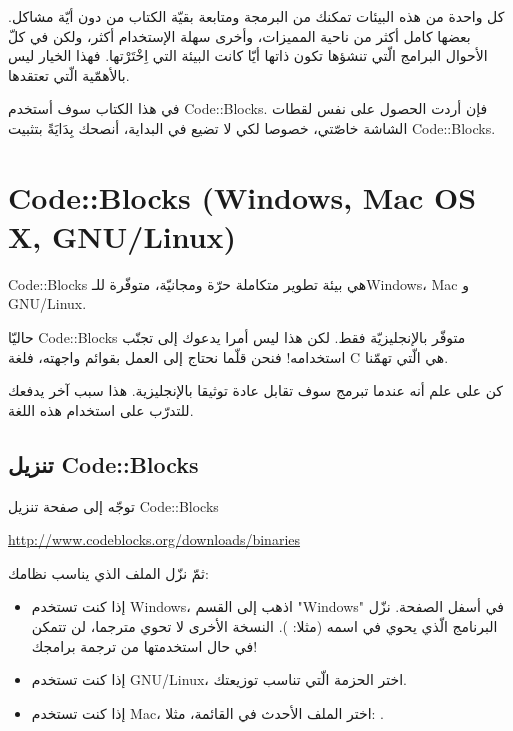 كل واحدة من هذه البيئات تمكنك من البرمجة ومتابعة بقيّة الكتاب من دون أيّة مشاكل. بعضها كامل أكثر من ناحية المميزات، وأخرى سهلة الإستخدام أكثر، ولكن في كلّ الأحوال البرامج الّتي تنشؤها تكون ذاتها أيّا كانت البيئة التي اِخْتَرْتها. فهذا الخيار ليس بالأهمّية الّتي تعتقدها.

في هذا الكتاب سوف أستخدم
\textenglish{Code::Blocks}.
فإن أردت الحصول على نفس لقطات الشاشة خاصّتي، خصوصا لكي لا تضيع في البداية، أنصحك بِدَايَةً بتثبيت
\textenglish{Code::Blocks}.

\section{\textenglish{Code::Blocks} (\textenglish{Windows, Mac OS X, GNU/Linux})}

\textenglish{Code::Blocks}
هي بيئة تطوير متكاملة حرّة ومجانيّة، متوفّرة للـ\textenglish{Windows}،
\textenglish{Mac}
و
\textenglish{GNU/Linux}.

حاليّا
\textenglish{Code::Blocks}
متوفّر بالإنجليزيّة فقط. لكن هذا ليس أمرا يدعوك إلى تجنّب استخدامه! فنحن قلّما نحتاج إلى العمل بقوائم واجهته، فلغة
\textenglish{C}
هي الّتي تهمّنا.

كن على علم أنه عندما تبرمج سوف تقابل عادة توثيقا بالإنجليزية. هذا سبب آخر يدفعك للتدرّب على استخدام هذه اللغة.

\subsection{تنزيل \textenglish{Code::Blocks}}

توجّه إلى صفحة تنزيل
\textenglish{Code::Blocks}

\url{http://www.codeblocks.org/downloads/binaries}

ثمّ نزّل الملف الذي يناسب نظامك:

\begin{itemize}
  \item إذا كنت تستخدم
\textenglish{Windows}،
اذهب إلى القسم
"\textenglish{Windows}"
في أسفل الصفحة. نزّل البرنامج الّذي يحوي
في اسمه (مثلا:
).
النسخة الأخرى لا تحوي مترجما، لن تتمكن في حال استخدمتها من ترجمة برامجك!
  \item إذا كنت تستخدم
\textenglish{GNU/Linux}،
اختر الحزمة الّتي تناسب توزيعتك.

  \item إذا كنت تستخدم
\textenglish{Mac}،
اختر الملف الأحدث في القائمة، مثلا:
.

\end{itemize}

